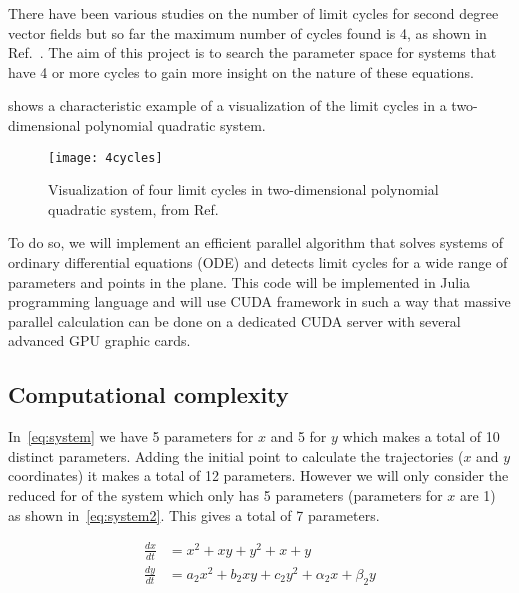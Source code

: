 There have been various studies on the number of limit cycles for second degree
vector fields but so far the maximum number of cycles found is 4, as shown in
Ref.~\cite{kuznetsov_visualization_2013}. The aim of this project is to search
the parameter space for systems that have 4 or more cycles to gain more insight
on the nature of these equations.

 shows a characteristic example of a visualization of the
limit cycles in a two-dimensional polynomial quadratic system.

\begin{figure}[H]
    \centering
    \texttt{[image: 4cycles]}
    \caption{Visualization of four limit cycles in two-dimensional polynomial quadratic system, from Ref.~\cite{kuznetsov_visualization_2013}
    }%
    \label{fig:kuznetsov}
\end{figure}

To do so, we will implement an efficient parallel algorithm that solves systems
of ordinary differential equations (ODE) and detects limit cycles for a wide
range of parameters and points in the plane.  This code will be implemented in
Julia programming language and will use CUDA framework in such a way that
massive parallel calculation can be done on a dedicated CUDA server with several
advanced GPU graphic cards.

\pagebreak

\subsection{Computational complexity}

In~\cref{eq:system} we have 5 parameters for $x$ and 5 for $y$ which makes a
total of 10 distinct parameters. Adding the initial point to calculate the
trajectories ($x$ and $y$ coordinates) it makes a total of 12 parameters.
However we will only consider the reduced for of the system which only has 5
parameters (parameters for $x$ are 1) as shown in~\cref{eq:system2}. This gives
a total of 7 parameters.

\begin{align}\label{eq:system2}
    \frac{dx}{dt} &= x^2 + xy + y^2 + x + y \nonumber \\
    \frac{dy}{dt} &= a_2x^2 + b_2xy + c_2y^2 + \alpha_2x + \beta_2y
\end{align}


